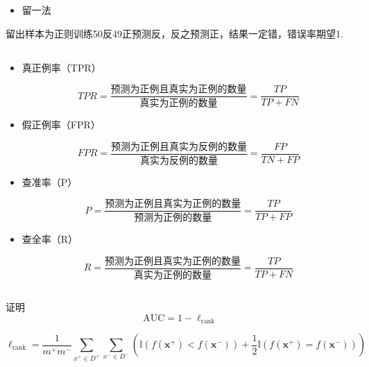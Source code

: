 \documentclass[UTF8,a4paper,AutoFakeBold,AutoFakeSlant]{article}
\begin{document}
\begin{itemize}
  \item 留一法
\end{itemize}
留出样本为正则训练50反49正预测反，反之预测正，结果一定错，错误率期望1.


\subsection{}
\begin{itemize}
  \item 真正例率（TPR）

        \begin{equation*}
          TPR = \frac{\text{预测为正例且真实为正例的数量}}{\text{真实为正例的数量}} =\frac{TP}{TP+FN}
        \end{equation*}
  \item 假正例率（FPR）

        \begin{equation*}
          FPR = \frac{\text{预测为正例且真实为反例的数量}}{\text{真实为反例的数量}} = \frac{FP}{TN+FP}
        \end{equation*}
  \item 查准率（P）

        \begin{equation*}
          P = \frac{\text{预测为正例且真实为正例的数量}}{\text{预测为正例的数量}} = \frac{TP}{TP+FP}
        \end{equation*}
  \item 查全率（R）

        \begin{equation*}
          R = \frac{\text{预测为正例且真实为正例的数量}}{\text{真实为正例的数量}} =\frac{TP}{TP+FN}
        \end{equation*}
\end{itemize}


\subsection{}
\begin{framed}
  证明
  \begin{equation*}
    \text{AUC} = 1-\ell_{\mathrm{rank}}
  \end{equation*}
\end{framed}

\begin{equation*}
  \ell_{\mathrm{rank}}=\frac{1}{m^{+} m^{-}} \sum_{x^{+} \in D^{+}} \sum_{x^{-} \in D^{-}}\left(\mathbb{I}\left(f\left(\boldsymbol{x}^{+}\right)<f\left(\boldsymbol{x}^{-}\right)\right)+\frac{1}{2} \mathbb{I}\left(f\left(\boldsymbol{x}^{+}\right)=f\left(\boldsymbol{x}^{-}\right)\right)\right)
\end{equation*}
\end{document}
